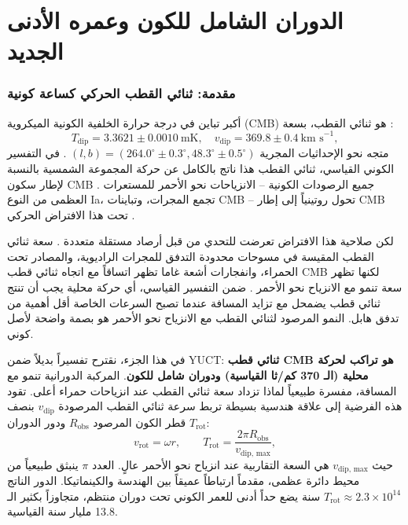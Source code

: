 \documentclass[12pt,a4paper]{article}
\begin{document}
	\part{الدوران الشامل للكون وعمره الأدنى الجديد}
	\label{part:IV}
	
	\section{مقدمة: ثنائي القطب الحركي كساعة كونية}
	
	أكبر تباين في درجة حرارة الخلفية الكونية الميكروية (CMB) هو ثنائي القطب، بسعة \cite{Planck2018VI, Planck2018VII}:
	\begin{equation}
		T_{\text{dip}} = 3.3621 \pm 0.0010\ \text{mK}, \quad v_{\text{dip}} = 369.8 \pm 0.4\ \text{km s}^{-1},
	\end{equation}
	متجه نحو الإحداثيات المجرية \((l,b) = (264.0^\circ \pm 0.3^\circ, 48.3^\circ \pm 0.5^\circ)\) \cite{Planck2018I}. في التفسير الكوني القياسي، ثنائي القطب هذا ناتج بالكامل عن حركة المجموعة الشمسية بالنسبة لإطار سكون CMB \cite{PlanckIntLVI}. جميع الرصودات الكونية – الانزياحات نحو الأحمر للمستعرات العظمى من النوع Ia، تجمع المجرات، وتباينات CMB – تحول روتينياً إلى إطار CMB تحت هذا الافتراض الحركي \cite{Planck2018V,Planck2018VI}.
	
	لكن صلاحية هذا الافتراض تعرضت للتحدي من قبل أرصاد مستقلة متعددة \cite{Gibelyou2012, Yoon2014}. سعة ثنائي القطب المقيسة في مسوحات محدودة التدفق للمجرات الراديوية، والمصادر تحت الحمراء، وانفجارات أشعة غاما تظهر اتساقاً مع اتجاه ثنائي قطب CMB لكنها تظهر سعة تنمو مع الانزياح نحو الأحمر \cite{Bengaly2017, Siewert2021, Colin2017, Secrest2025}. ضمن التفسير القياسي، أي حركة محلية يجب أن تنتج ثنائي قطب يضمحل مع تزايد المسافة عندما تصبح السرعات الخاصة أقل أهمية من تدفق هابل. النمو المرصود لثنائي القطب مع الانزياح نحو الأحمر هو بصمة واضحة لأصل كوني.
	
	في هذا الجزء، نقترح تفسيراً بديلاً ضمن YUCT: \textbf{ثنائي قطب CMB هو تراكب لحركة محلية (الـ 370 كم/ثا القياسية) ودوران شامل للكون}. المركبة الدورانية تنمو مع المسافة، مفسرة طبيعياً لماذا تزداد سعة ثنائي القطب عند انزياحات حمراء أعلى. تقود هذه الفرضية إلى علاقة هندسية بسيطة تربط سرعة ثنائي القطب المرصودة \(v_{\text{dip}}\) بنصف قطر الكون المرصود \(R_{\text{obs}}\) ودور الدوران \(T_{\text{rot}}\):
	\begin{equation}
		v_{\text{rot}} = \omega r, \qquad T_{\text{rot}} = \frac{2\pi R_{\text{obs}}}{v_{\text{dip, max}}},
	\end{equation}
	حيث \(v_{\text{dip, max}}\) هي السعة التقاربية عند انزياح نحو الأحمر عالٍ. العدد \(\pi\) ينبثق طبيعياً من محيط دائرة عظمى، مقدماً ارتباطاً عميقاً بين الهندسة والكينماتيكا. الدور الناتج \(T_{\text{rot}} \approx 2.3 \times 10^{14}\) سنة يضع حداً أدنى للعمر الكوني تحت دوران منتظم، متجاوزاً بكثير الـ 13.8 مليار سنة القياسية.
	
\end{document}
